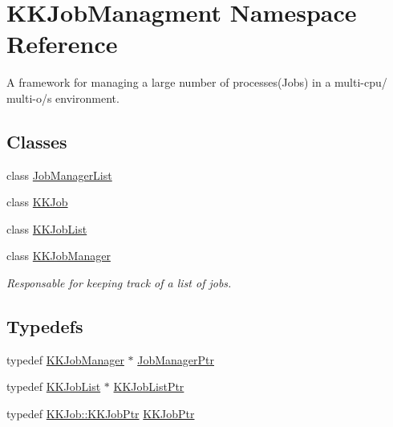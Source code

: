 \hypertarget{namespace_k_k_job_managment}{}\section{K\+K\+Job\+Managment Namespace Reference}
\label{namespace_k_k_job_managment}


A framework for managing a large number of processes(\+Jobs) in a multi-\/cpu/ multi-\/o/s environment.  


\subsection*{Classes}
\begin{DoxyCompactItemize}
\item 
class \hyperlink{class_k_k_job_managment_1_1_job_manager_list}{Job\+Manager\+List}
\item 
class \hyperlink{class_k_k_job_managment_1_1_k_k_job}{K\+K\+Job}
\item 
class \hyperlink{class_k_k_job_managment_1_1_k_k_job_list}{K\+K\+Job\+List}
\item 
class \hyperlink{class_k_k_job_managment_1_1_k_k_job_manager}{K\+K\+Job\+Manager}
\begin{DoxyCompactList}\small\item\em Responsable for keeping track of a list of jobs. \end{DoxyCompactList}\end{DoxyCompactItemize}
\subsection*{Typedefs}
\begin{DoxyCompactItemize}
\item 
typedef \hyperlink{class_k_k_job_managment_1_1_k_k_job_manager}{K\+K\+Job\+Manager} $\ast$ \hyperlink{namespace_k_k_job_managment_aa12a7270f9983ca4ed916533dc8adbc4}{Job\+Manager\+Ptr}
\item 
typedef \hyperlink{class_k_k_job_managment_1_1_k_k_job_list}{K\+K\+Job\+List} $\ast$ \hyperlink{namespace_k_k_job_managment_a56a0b6cdfa294a14b789c80701f456de}{K\+K\+Job\+List\+Ptr}
\item 
typedef \hyperlink{class_k_k_job_managment_1_1_k_k_job_a53526e4ffe4ab2b7858f79ab0ed65a1d}{K\+K\+Job\+::\+K\+K\+Job\+Ptr} \hyperlink{namespace_k_k_job_managment_a852ed63ebf0c5655d281b510dfb34484}{K\+K\+Job\+Ptr}
\end{DoxyCompactItemize}


